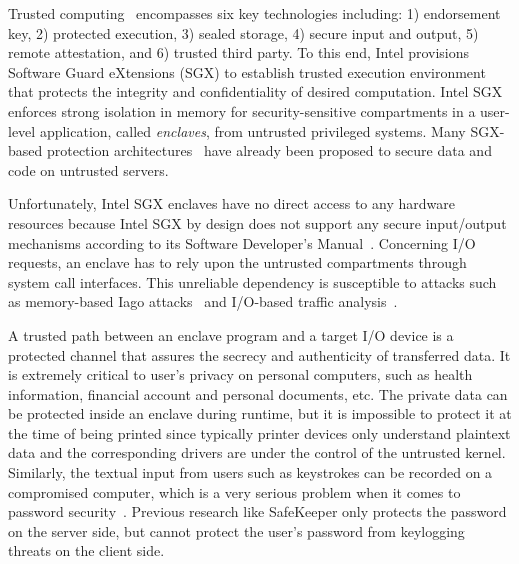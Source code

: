 \documentclass[journal,twocolumn,letterpaper,10pt]{IEEEtran}
\begin{document}
Trusted computing~\cite{DBLP:journals/ieeesp/Felten03} encompasses six key technologies including: 1) endorsement key, 2) protected execution, 3) sealed storage, 4) secure input and output, 5) remote attestation, and 6) trusted third party. To this end, Intel provisions Software Guard eXtensions (SGX) \cite{DBLP:conf/isca/McKeenABRSSS13} to establish trusted execution environment that protects the integrity and confidentiality of desired computation. Intel SGX enforces strong isolation in memory for security-sensitive compartments in a user-level application, called \textit{enclaves}, from untrusted privileged systems. Many SGX-based protection architectures~\cite{DBLP:journals/tocs/BaumannPH15,DBLP:conf/osdi/HuntZXPW16,DBLP:conf/osdi/ArnautovTGKMPLM16,DBLP:conf/icdcs/NguyenG17,7545819,DBLP:conf/sp/SchusterCFGPMR15} have already been proposed to secure data and code on untrusted servers.

Unfortunately, Intel SGX enclaves have no direct access to any hardware resources because Intel SGX by design does not support any secure input/output mechanisms according to its Software Developer's Manual~\cite{Corporation2016Intel}. Concerning I/O requests, an enclave has to rely upon the untrusted compartments through system call interfaces. This unreliable dependency is susceptible to attacks such as memory-based Iago attacks~\cite{DBLP:conf/asplos/CheckowayS13} and I/O-based traffic analysis~\cite{DBLP:conf/ccs/MittalKJCB11}.

A trusted path between an enclave program and a target I/O device is a protected channel that assures the secrecy and authenticity of transferred data. It is extremely critical to user's privacy on personal computers, such as health information, financial account and personal documents, etc. The private data can be protected inside an enclave during runtime, but it is impossible to protect it at the time of being printed since typically printer devices only understand plaintext data and the corresponding drivers are under the control of the untrusted kernel. Similarly, the textual input from users such as keystrokes can be recorded on a compromised computer, which is a very serious problem when it comes to password security~\cite{DBLP:conf/uss/SilverJBCJ14}. Previous research like SafeKeeper \cite{DBLP:conf/www/KrawieckaKPMA18} only protects the password on the server side, but cannot protect the user's password from keylogging threats on the client side.
\end{document}
